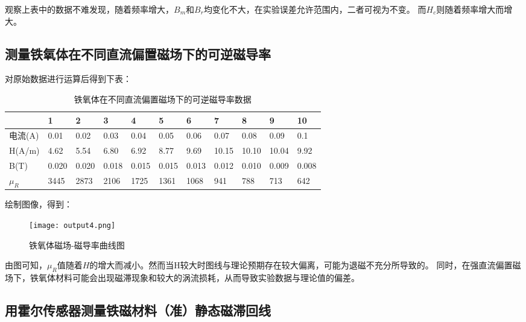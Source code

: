 \documentclass[UTF-8,twoside,cs4size]{ctexart}
\begin{document}
观察上表中的数据不难发现，随着频率增大，$B_m$和$B_r$均变化不大，在实验误差允许范围内，二者可视为不变。
而$H_c$则随着频率增大而增大。

\subsection{测量铁氧体在不同直流偏置磁场下的可逆磁导率}
对原始数据进行运算后得到下表：
\begin{table}[!h]
    \centering
    \caption{铁氧体在不同直流偏置磁场下的可逆磁导率数据}
    \begin{tabular}{|l|l|l|l|l|l|l|l|l|l|l|}
    \hline
        ~ & 1 & 2 & 3 & 4 & 5 & 6 & 7 & 8 & 9 & 10 \\ \hline
        电流(A) & 0.01 & 0.02 & 0.03 & 0.04 & 0.05 & 0.06 & 0.07 & 0.08 & 0.09 & 0.1 \\ \hline
        H(A/m) & 4.62  & 5.54  & 6.80  & 6.92  & 8.77  & 9.69  & 10.15  & 10.10  & 10.04  & 9.92  \\ \hline
        B(T) & 0.020  & 0.020  & 0.018  &0.015& 0.015& 0.013  & 0.012  & 0.010  & 0.009  & 0.008   \\ \hline
        $\mu_R$ & 3445  & 2873  & 2106  & 1725  & 1361  & 1068  & 941 & 788  & 713  & 642 \\ \hline
    \end{tabular}
\end{table}
\newpage
绘制图像，得到：\\
\begin{figure}[!h]
    \centering
    \texttt{[image: output4.png]}
    \caption{铁氧体磁场-磁导率曲线图}
\end{figure}

由图可知，$\mu_R$值随着$H$的增大而减小。然而当H较大时图线与理论预期存在较大偏离，可能为退磁不充分所导致的。
同时，在强直流偏置磁场下，铁氧体材料可能会出现磁滞现象和较大的涡流损耗，从而导致实验数据与理论值的偏差。

\subsection{用霍尔传感器测量铁磁材料（准）静态磁滞回线}
\end{document}
